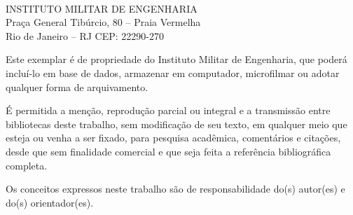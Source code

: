 \documentclass[
	12pt,				%
	openright,			%
    oneside,
	a4paper,			%
	chapter=TITLE,
	english,			%
	brazil				%
	]{abntex2}
\begin{document}
\begin{fichacatalografica}
	\sffamily
	\begin{normalsize}
    \\
    INSTITUTO MILITAR DE ENGENHARIA\\
    Praça General Tibúrcio, 80 – Praia Vermelha\\
    Rio de Janeiro – RJ CEP: 22290-270\\
    \par\noindent
    Este exemplar é de propriedade do Instituto Militar de Engenharia, que poderá incluí-lo em base de dados, armazenar em computador, microfilmar ou adotar qualquer forma de arquivamento.
    \par\noindent
    É permitida a menção, reprodução parcial ou integral e a transmissão entre bibliotecas deste trabalho, sem modificação de seu texto, em qualquer meio que esteja ou venha a ser fixado, para pesquisa acadêmica, comentários e citações, desde que sem finalidade comercial e que seja feita a referência bibliográfica completa.
    \par\noindent
    Os conceitos expressos neste trabalho são de responsabilidade do(s) autor(es) e do(s) orientador(es).
    \end{normalsize}
    
	\vspace*{\fill}
	
	\begin{center}
	\end{center}
\end{fichacatalografica}
\end{document}
